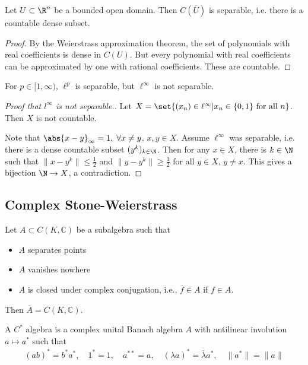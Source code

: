 \documentclass{article}
\begin{document}
\begin{cor}
    Let $U \subset \R^n$ be a bounded open domain. Then $C(\overline{U})$ is separable, i.e. there is a countable dense subset.
\end{cor}

\begin{proof}
    By the Weierstrass approximation theorem, the set of polynomials with real coefficients is dense in $C(U)$.
    But every polynomial with real coefficients can be approximated by one with rational coefficients.
    These are countable.
\end{proof}

\begin{remark}
    For $p \in [1, \infty)$, $\ell^p$ is separable, but $\ell^\infty$ is not separable.
\end{remark}

\begin{proof}[Proof that $l^\infty$ is not separable.]
    Let $X = \set{(x_n) \in \ell^\infty | x_n \in \{0, 1\} \text{ for all } n}$.
    Then $X$ is not countable.

    Note that $\abs{x - y}_\infty = 1, \; \forall x \neq y$, $x, y \in X$.
    Assume $\ell^\infty$ was separable, i.e. there is a dense countable subset $(y^k)_{k \in \N}$.
    Then for any $x \in X$, there is $k \in \N$ such that $\|x - y^k\| \leq \frac{1}{2}$ and $\|y - y^k\| \geq \frac{1}{2}$ for all $y \in X$, $y \neq x$.
    This gives a bijection $\N \to X$, a contradiction. %
\end{proof}


\subsection{Complex Stone-Weierstrass}
\begin{thm}
    Let $A \subset C(K, \mathbb{C})$ be a subalgebra such that
    \begin{itemize}
        \item $A$ separates points
        \item $A$ vanishes nowhere
        \item $A$ is closed under complex conjugation, i.e., $\overline{f} \in A$ if $f \in A$.
    \end{itemize}
    Then $\overline{A} = C(K, \mathbb{C})$.
\end{thm}

\begin{defi}[$C^*$-algebra]
    A $C^*$ algebra is a complex unital Banach algebra $A$ with antilinear involution $a \mapsto a^*$ such that
    \begin{align*}
        (ab)^* = b^* a^*, \quad 1^* = 1, \quad a^{**} = a, \quad (\lambda a)^* = \overline{\lambda} a^*, \quad \|a^*\| = \|a\|
    \end{align*}
\end{defi}
\end{document}
